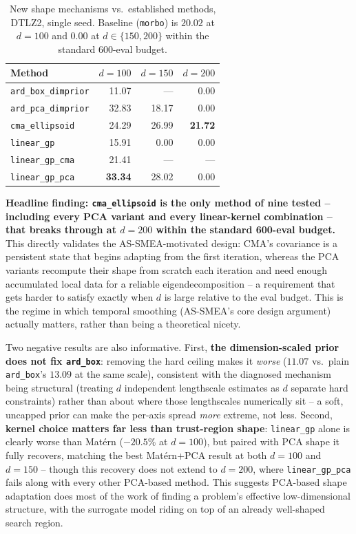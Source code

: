 \documentclass[11pt]{article}
\begin{document}
\begin{table}[h]
\centering
\caption{New shape mechanisms vs.\ established methods, DTLZ2, single seed.
Baseline (\texttt{morbo}) is $20.02$ at $d{=}100$ and $0.00$ at
$d{\in}\{150,200\}$ within the standard 600-eval budget.}
\label{tab:tr-shape-new-methods}
\begin{tabular}{lrrr}
\toprule
Method & $d{=}100$ & $d{=}150$ & $d{=}200$ \\
\midrule
\texttt{ard\_box\_dimprior} & 11.07 & --- & 0.00 \\
\texttt{ard\_pca\_dimprior} & 32.83 & 18.17 & 0.00 \\
\texttt{cma\_ellipsoid} & 24.29 & 26.99 & \textbf{21.72} \\
\texttt{linear\_gp} & 15.91 & 0.00 & 0.00 \\
\texttt{linear\_gp\_cma} & 21.41 & --- & --- \\
\texttt{linear\_gp\_pca} & \textbf{33.34} & 28.02 & 0.00 \\
\bottomrule
\end{tabular}
\end{table}

\textbf{Headline finding: \texttt{cma\_ellipsoid} is the only method of nine
tested -- including every PCA variant and every linear-kernel combination --
that breaks through at $d{=}200$ within the standard 600-eval budget.} This
directly validates the AS-SMEA-motivated design: CMA's covariance is a
persistent state that begins adapting from the first iteration, whereas the
PCA variants recompute their shape from scratch each iteration and need
enough accumulated local data for a reliable eigendecomposition -- a
requirement that gets harder to satisfy exactly when $d$ is large relative
to the eval budget. This is the regime in which temporal smoothing
(AS-SMEA's core design argument) actually matters, rather than being a
theoretical nicety.

Two negative results are also informative. First, \textbf{the
dimension-scaled prior does not fix \texttt{ard\_box}}: removing the hard
ceiling makes it \emph{worse} ($11.07$ vs.\ plain \texttt{ard\_box}'s
$13.09$ at the same scale), consistent with the diagnosed mechanism being
structural (treating $d$ independent lengthscale estimates as $d$ separate
hard constraints) rather than about where those lengthscales numerically
sit -- a soft, uncapped prior can make the per-axis spread \emph{more}
extreme, not less. Second, \textbf{kernel choice matters far less than
trust-region shape}: \texttt{linear\_gp} alone is clearly worse than
Mat\'ern ($-20.5\%$ at $d{=}100$), but paired with PCA shape it fully
recovers, matching the best Mat\'ern+PCA result at both $d{=}100$ and
$d{=}150$ -- though this recovery does not extend to $d{=}200$, where
\texttt{linear\_gp\_pca} fails along with every other PCA-based method.
This suggests PCA-based shape adaptation does most of the work of finding
a problem's effective low-dimensional structure, with the surrogate model
riding on top of an already well-shaped search region.
\end{document}
